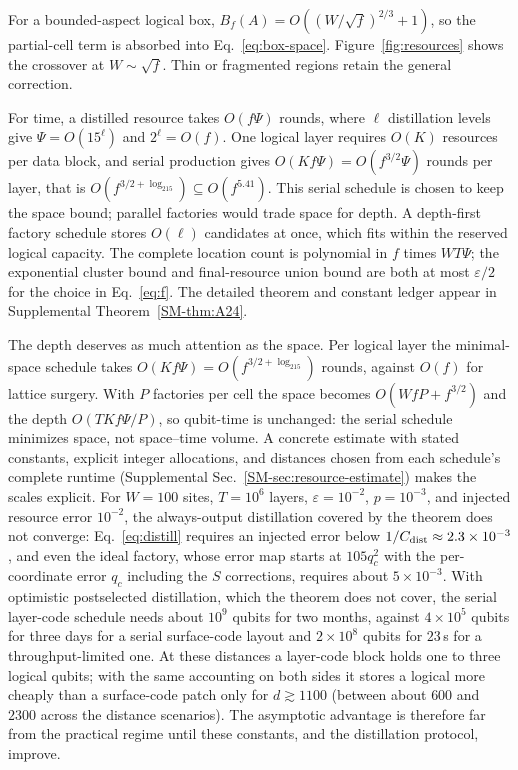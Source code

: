 For a bounded-aspect logical box,
$B_f(A)=O((W/\sqrt f)^{2/3}+1)$, so the partial-cell term is absorbed into
Eq.~\eqref{eq:box-space}. Figure~\ref{fig:resources} shows the crossover at
$W\sim\sqrt f$. Thin or fragmented regions retain the general correction.

For time, a distilled resource takes $O(f\Psi)$ rounds, where $\ell$
distillation levels give $\Psi=O(15^\ell)$ and $2^\ell=O(f)$. One logical
layer requires $O(K)$ resources per data block, and serial production gives
$O(Kf\Psi)=O(f^{3/2}\Psi)$ rounds per layer, that is
$O(f^{3/2+\log_215})\subseteq O(f^{5.41})$. This serial schedule is chosen
to keep the space bound; parallel factories would trade space for depth. A depth-first factory schedule
stores $O(\ell)$ candidates at once, which fits within the reserved logical
capacity. The complete location count is polynomial in $f$ times
$WT\Psi$; the exponential cluster bound and final-resource union bound are
both at most $\varepsilon/2$ for the choice in Eq.~\eqref{eq:f}.
The detailed theorem and constant ledger appear in Supplemental
Theorem~\ref{SM-thm:A24}.

The depth deserves as much attention as the space.  Per logical layer the
minimal-space schedule takes $O(Kf\Psi)=O(f^{3/2+\log_215})$ rounds, against
$O(f)$ for lattice surgery.  With $P$ factories per cell the space becomes
$O(WfP+f^{3/2})$ and the depth $O(TKf\Psi/P)$, so qubit-time is unchanged: the
serial schedule minimizes space, not space--time volume.  A concrete estimate
with stated constants, explicit integer allocations, and distances chosen
from each schedule's complete runtime (Supplemental
Sec.~\ref{SM-sec:resource-estimate}) makes the scales explicit.  For $W=100$
sites, $T=10^6$ layers, $\varepsilon=10^{-2}$, $p=10^{-3}$, and injected
resource error $10^{-2}$, the always-output distillation covered by the
theorem does not converge: Eq.~\eqref{eq:distill} requires an injected error
below $1/C_{\rm dist}\approx2.3\times10^{-3}$, and even the ideal factory,
whose error map starts at $105q_c^2$ with the per-coordinate error $q_c$
including the $S$ corrections, requires about $5\times10^{-3}$.  With
optimistic postselected distillation, which the theorem does not cover, the
serial layer-code schedule needs about $10^9$ qubits for two months, against
$4\times10^5$ qubits for three days for a serial surface-code layout and
$2\times10^8$ qubits for $23$\,s for a throughput-limited one.  At these
distances a layer-code block holds one to three logical qubits; with the same
accounting on both sides it stores a logical more cheaply than a surface-code
patch only for $d\gtrsim1100$ (between about $600$ and $2300$ across the
distance scenarios).
The asymptotic advantage is therefore far from the practical regime until
these constants, and the distillation protocol, improve.

